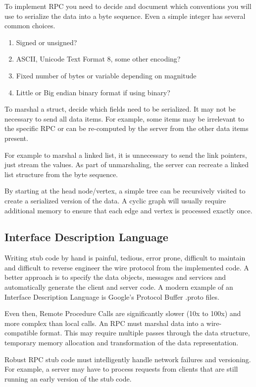 To implement RPC you need to decide and document which conventions you will use to serialize the data into a byte sequence.
Even a simple integer has several common choices.

\begin{enumerate}
\item Signed or unsigned?
\item ASCII, Unicode Text Format 8, some other encoding?
\item Fixed number of bytes or variable depending on magnitude
\item Little or Big endian binary format if using binary?
\end{enumerate}

To marshal a struct, decide which fields need to be serialized.
It may not be necessary to send all data items.
For example, some items may be irrelevant to the specific RPC or can be re-computed by the server from the other data items present.

For example to marshal a linked list, it is unnecessary to send the link pointers, just stream the values.
As part of unmarshaling, the server can recreate a linked list structure from the byte sequence.

By starting at the head node/vertex, a simple tree can be recursively visited to create a serialized version of the data.
A cyclic graph will usually require additional memory to ensure that each edge and vertex is processed exactly once.

\subsection{Interface Description Language}

Writing stub code by hand is painful, tedious, error prone, difficult to maintain and difficult to reverse engineer the wire protocol from the implemented code.
A better approach is to specify the data objects, messages and services and automatically generate the client and server code.
A modern example of an Interface Description Language is Google's Protocol Buffer .proto files.

Even then, Remote Procedure Calls are significantly slower (10x to 100x) and more complex than local calls.
An RPC must marshal data into a wire-compatible format.
This may require multiple passes through the data structure, temporary memory allocation and transformation of the data representation.

Robust RPC stub code must intelligently handle network failures and versioning.
For example, a server may have to process requests from clients that are still running an early version of the stub code.

